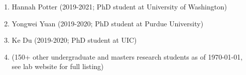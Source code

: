 \documentclass[10pt,letterpaper]{article}
\renewenvironment{itemize}{
  \begin{list}{}{
    \setlength{\leftmargin}{1.25em}
    \setlength{\itemsep}{0.25em}
    \setlength{\parskip}{0pt}
    \setlength{\parsep}{0.2em}
  }
}{
  \end{list}
}
\begin{document}
\begin{itemize}
\begin{enumerate}
          \item Hannah Potter (2019-2021; PhD student at University of Washington)
          \item Yongwei Yuan (2019-2020; PhD student at Purdue University)
          \item Ke Du (2019-2020; PhD student at UIC)
          \item[...] (150+ other undergraduate and masters research students as of \today, see lab website for full listing)
        \end{enumerate}
\end{itemize}
\end{document}
